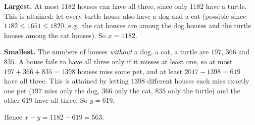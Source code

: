 \textbf{Largest.} At most $1182$ houses can have all three, since only $1182$ have a turtle. This is attained: let every turtle house also have a dog and a cat (possible since $1182\le1651\le1820$, e.g.\ the cat houses are among the dog houses and the turtle houses among the cat houses). So $x=1182$.

\textbf{Smallest.} The numbers of houses \emph{without} a dog, a cat, a turtle are $197$, $366$ and $835$. A house fails to have all three only if it misses at least one, so at most $197+366+835=1398$ houses miss some pet, and at least $2017-1398=619$ have all three. This is attained by letting $1398$ different houses each miss exactly one pet ($197$ miss only the dog, $366$ only the cat, $835$ only the turtle) and the other $619$ have all three. So $y=619$.

Hence $x-y=1182-619=\boxed{563}$.
